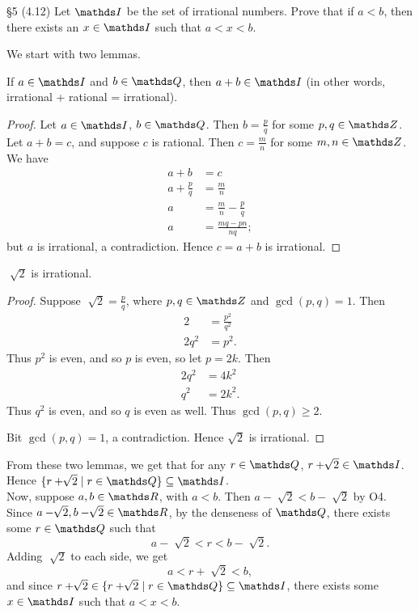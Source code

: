 \documentclass{homework}
\begin{document}
\begin{problem}{\S 5}
  (4.12) Let $\I$ be the set of irrational numbers. Prove that if $a<b$, then there exists an $x\in
  \I$ such that $a<x<b$.
\end{problem}
\begin{solution}
  We start with two lemmas.
  \begin{lemma}[]{}
    If $a\in \I$ and $b\in \Q$, then $a+b\in \I$ (in other words, irrational + rational =
    irrational).
  \end{lemma}
  \begin{proof}[Proof]
    Let $a\in \I$, $b\in \Q$. Then $b=\frac{p}{q}$ for some $p,q\in \Z$. Let $a+b=c$, and suppose
    $c$ is rational. Then $c=\frac{m}{n}$ for some $m,n\in \Z$. We have
    \begin{align*}
      a+b &= c \\
      a+\frac{p}{q}&= \frac{m}{n} \\
      a&= \frac{m}{n}-\frac{p}{q} \\
      a&= \frac{mq-pn}{nq}
    ;\end{align*} but $a$ is irrational, a contradiction. Hence $c=a+b$ is irrational.
  \end{proof}
  \begin{lemma}[]{}
    $\sqrt[]{2} $ is irrational.
  \end{lemma}
  \begin{proof}[Proof]
    Suppose $\sqrt[]{2} =\frac{p}{q}$, where $p,q\in \Z $ and $\gcd{(p,q)}=1$. Then
    \begin{align*}
      2&=\frac{p^2}{q^2}\\
      2q^2&=p^2
    .\end{align*}
    Thus $p^2$ is even, and so $p$ is even, so let $p=2k$. Then
    \begin{align*}
      2q^2&= 4k^2 \\
      q^2&=2k^2
    .\end{align*}
    Thus $q^2$ is even, and so $q$ is even as well. Thus $\gcd{(p,q)}\ge 2$.

    Bit $\gcd{(p,q)}=1$, a contradiction. Hence $\sqrt{2} $ is irrational.
  \end{proof}
  From these two lemmas, we get that for any $r\in \Q$, $r+\sqrt[]{2} \in \I$. Hence $\{r+\sqrt[]{2}
  \mid r\in \Q\} \subseteq \I$.\\
  Now, suppose $a,b\in \R$, with $a<b$. Then $a-\sqrt[]{2} <b-\sqrt[]{2} $ by O4. Since
  $a-\sqrt[]{2} ,b-\sqrt[]{2} \in \R$, by the denseness of $ \Q$, there exists some $r\in \Q$ such
  that \[
    a-\sqrt[]{2} <r<b-\sqrt[]{2} 
  .\] 
  Adding $\sqrt[]{2} $ to each side, we get \[
    a < r+\sqrt[]{2} <b
  ,\]  and since $r+\sqrt[]{2} \in \{r+\sqrt[]{2} \mid r\in \Q\} \subseteq \I$, there exists some
  $x\in \I$ such that $a<x<b$.
  
\end{solution}
\end{document}
